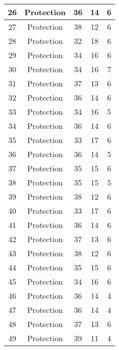 \documentclass[results.tex]{subfiles}
\begin{document}
\begin{center}
\begin{tabular}{| c || c | c | c | c |}
    \hline
    26 & Protection & 36 & 14 & 6 \\ 
    \hline
    27 & Protection & 38 & 12 & 6 \\ 
    \hline
    28 & Protection & 32 & 18 & 6 \\ 
    \hline
    29 & Protection & 34 & 16 & 6 \\ 
    \hline
    30 & Protection & 34 & 16 & 7 \\ 
    \hline
    31 & Protection & 37 & 13 & 6 \\ 
    \hline
    32 & Protection & 36 & 14 & 6 \\ 
    \hline
    33 & Protection & 34 & 16 & 5 \\ 
    \hline
    34 & Protection & 36 & 14 & 6 \\ 
    \hline
    35 & Protection & 33 & 17 & 6 \\ 
    \hline
    36 & Protection & 36 & 14 & 5 \\ 
    \hline
    37 & Protection & 35 & 15 & 6 \\ 
    \hline
    38 & Protection & 35 & 15 & 5 \\ 
    \hline
    39 & Protection & 38 & 12 & 6 \\ 
    \hline
    40 & Protection & 33 & 17 & 6 \\ 
    \hline
    41 & Protection & 36 & 14 & 6 \\ 
    \hline
    42 & Protection & 37 & 13 & 6 \\ 
    \hline
    43 & Protection & 38 & 12 & 6 \\ 
    \hline
    44 & Protection & 35 & 15 & 6 \\ 
    \hline
    45 & Protection & 34 & 16 & 6 \\ 
    \hline
    46 & Protection & 36 & 14 & 4 \\ 
    \hline
    47 & Protection & 36 & 14 & 4 \\ 
    \hline
    48 & Protection & 37 & 13 & 6 \\ 
    \hline
    49 & Protection & 39 & 11 & 4 \\ 
    \hline   \end{tabular}
\end{center}
\end{document}
